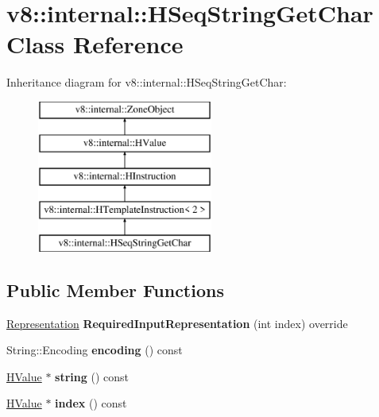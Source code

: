 \hypertarget{classv8_1_1internal_1_1_h_seq_string_get_char}{}\section{v8\+:\+:internal\+:\+:H\+Seq\+String\+Get\+Char Class Reference}
\label{classv8_1_1internal_1_1_h_seq_string_get_char}
Inheritance diagram for v8\+:\+:internal\+:\+:H\+Seq\+String\+Get\+Char\+:\begin{figure}[H]
\begin{center}
\leavevmode
\includegraphics[height=5.000000cm]{classv8_1_1internal_1_1_h_seq_string_get_char}
\end{center}
\end{figure}
\subsection*{Public Member Functions}
\begin{DoxyCompactItemize}
\item 
\hyperlink{classv8_1_1internal_1_1_representation}{Representation} {\bfseries Required\+Input\+Representation} (int index) override\hypertarget{classv8_1_1internal_1_1_h_seq_string_get_char_a32ea6fdf0bf30512c638846c651dc37b}{}\label{classv8_1_1internal_1_1_h_seq_string_get_char_a32ea6fdf0bf30512c638846c651dc37b}

\item 
String\+::\+Encoding {\bfseries encoding} () const \hypertarget{classv8_1_1internal_1_1_h_seq_string_get_char_a174124fb0ed0d722a0490caf96585870}{}\label{classv8_1_1internal_1_1_h_seq_string_get_char_a174124fb0ed0d722a0490caf96585870}

\item 
\hyperlink{classv8_1_1internal_1_1_h_value}{H\+Value} $\ast$ {\bfseries string} () const \hypertarget{classv8_1_1internal_1_1_h_seq_string_get_char_a9ce7eae3335302032ac662deb581c8c5}{}\label{classv8_1_1internal_1_1_h_seq_string_get_char_a9ce7eae3335302032ac662deb581c8c5}

\item 
\hyperlink{classv8_1_1internal_1_1_h_value}{H\+Value} $\ast$ {\bfseries index} () const \hypertarget{classv8_1_1internal_1_1_h_seq_string_get_char_ad8a0913fdff20a8c4a9dca819d0918a8}{}\label{classv8_1_1internal_1_1_h_seq_string_get_char_ad8a0913fdff20a8c4a9dca819d0918a8}

\end{DoxyCompactItemize}
